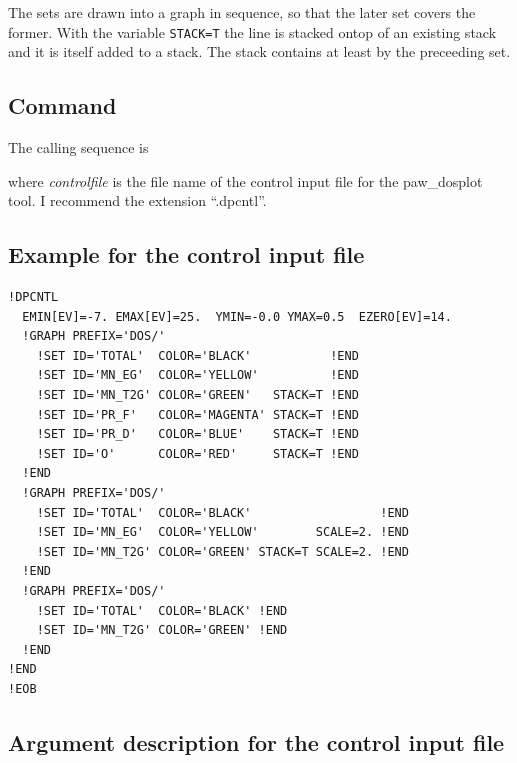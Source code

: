 \documentclass[final,12pt,makeidx,DIV=calc]{article}
\begin{document}
{{{{{{The sets are drawn into a graph in sequence, so that the later set
covers the former. With the variable \texttt{STACK=T} the line is
stacked ontop of an existing stack and it is itself added to a
stack. The stack contains at least by the preceeding set.


\subsection{Command}

The calling sequence is

\bigskip{}\bigskip

\noindent
where {\it controlfile} is the file name of the control input file for
the paw\_dosplot tool. I recommend the extension ``.dpcntl''.




\subsection{Example for the control input file}

\begin{verbatim}
!DPCNTL
  EMIN[EV]=-7. EMAX[EV]=25.  YMIN=-0.0 YMAX=0.5  EZERO[EV]=14.
  !GRAPH PREFIX='DOS/'
    !SET ID='TOTAL'  COLOR='BLACK'           !END
    !SET ID='MN_EG'  COLOR='YELLOW'          !END
    !SET ID='MN_T2G' COLOR='GREEN'   STACK=T !END
    !SET ID='PR_F'   COLOR='MAGENTA' STACK=T !END
    !SET ID='PR_D'   COLOR='BLUE'    STACK=T !END
    !SET ID='O'      COLOR='RED'     STACK=T !END
  !END
  !GRAPH PREFIX='DOS/' 
    !SET ID='TOTAL'  COLOR='BLACK'                  !END
    !SET ID='MN_EG'  COLOR='YELLOW'        SCALE=2. !END
    !SET ID='MN_T2G' COLOR='GREEN' STACK=T SCALE=2. !END
  !END
  !GRAPH PREFIX='DOS/'
    !SET ID='TOTAL'  COLOR='BLACK' !END
    !SET ID='MN_T2G' COLOR='GREEN' !END
  !END
!END
!EOB
\end{verbatim}

\newpage
\subsection{Argument description for the control input file}

}}}}}}
\end{document}
